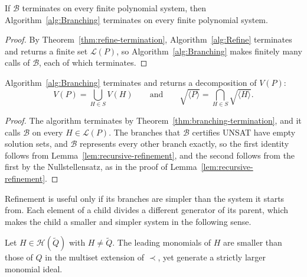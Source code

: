 \begin{theorem}
  \label{thm:branching-termination}
  If $\mathcal B$ terminates on every finite polynomial system, then
  Algorithm~\ref{alg:Branching} terminates on every finite polynomial system.
\end{theorem}

\begin{proof}
  By Theorem~\ref{thm:refine-termination}, Algorithm~\ref{alg:Refine}
  terminates and returns a finite set $\mathcal L(P)$, so
  Algorithm~\ref{alg:Branching} makes finitely many calls of $\mathcal B$, each
  of which terminates.
\end{proof}

\begin{theorem}
  \label{thm:branching-correctness}
  Algorithm~\ref{alg:Branching} terminates and returns a decomposition of
  $V(P)$:
  \[
    V(P)=\bigcup_{H\in S}V(H)
    \qquad\text{and}\qquad
    \sqrt{\langle P\rangle}=\bigcap_{H\in S}\sqrt{\langle H\rangle}.
  \]
\end{theorem}

\begin{proof}
  The algorithm terminates by Theorem~\ref{thm:branching-termination}, and it
  calls $\mathcal B$ on every $H\in\mathcal L(P)$. The branches that
  $\mathcal B$ certifies UNSAT have empty
  solution sets, and $\mathcal B$ represents every other branch exactly, so the
  first identity follows from Lemma~\ref{lem:recursive-refinement}, and the
  second follows from the first by the Nullstellensatz, as in the proof of
  Lemma~\ref{lem:recursive-refinement}.
\end{proof}

Refinement is useful only if its branches are simpler than the system it
starts from. Each element of a child divides a different generator of its
parent, which makes the child a smaller and simpler system in the following
sense.

\begin{theorem}
  \label{thm:refine-simpler}
  Let $H\in\mathcal H(\widetilde Q)$ with $H\neq\widetilde Q$. The leading
  monomials of $H$ are smaller than those of $Q$ in the multiset extension of
  $\prec$, yet generate a strictly larger monomial ideal.
\end{theorem}

